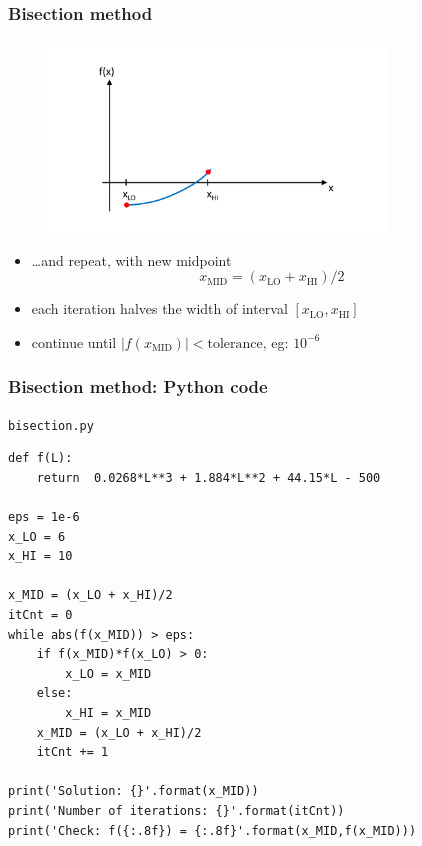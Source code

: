 \documentclass[english,14pt]{beamer}
\begin{document}

\begin{frame}[fragile]

\frametitle{Bisection method}

\vspace*{-10mm}
\begin{figure}[ht]
	\centering
	\includegraphics[width=0.8\textwidth]{figures/bisection4}
\end{figure}
\vspace*{-10mm}
\begin{itemize}
\item[] \quad\ldots and repeat, with new midpoint
\[
	x_\mathrm{MID} = (x_\mathrm{LO}+x_\mathrm{HI})/2
\]
\item each iteration halves the width of interval $[x_\mathrm{LO},x_\mathrm{HI}]$
\item continue until $|f(x_\mathrm{MID})| < \mathrm{tolerance}$, eg: $10^{-6}$
\end{itemize}

\end{frame}


\begin{frame}[fragile]

\frametitle{Bisection method: Python code}
\vspace*{-4mm}
{\small \texttt{bisection.py}}
\vspace*{-2mm}
\begin{lstlisting}[style=CStyle,basicstyle=\scriptsize]
def f(L):
    return  0.0268*L**3 + 1.884*L**2 + 44.15*L - 500

eps = 1e-6
x_LO = 6
x_HI = 10

x_MID = (x_LO + x_HI)/2
itCnt = 0
while abs(f(x_MID)) > eps:
    if f(x_MID)*f(x_LO) > 0:
        x_LO = x_MID
    else:
        x_HI = x_MID
    x_MID = (x_LO + x_HI)/2
    itCnt += 1

print('Solution: {}'.format(x_MID))
print('Number of iterations: {}'.format(itCnt))
print('Check: f({:.8f}) = {:.8f}'.format(x_MID,f(x_MID)))
\end{lstlisting}

\end{frame}
\end{document}
